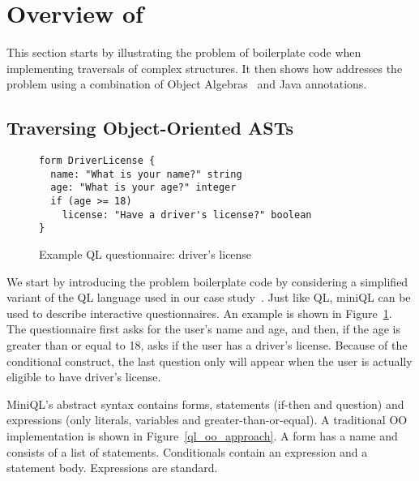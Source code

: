 \section{Overview of \name}\label{subsec:overview}

This section starts by illustrating the problem of boilerplate code when implementing
traversals of complex structures. It then shows how \name addresses
the problem using a combination of Object Algebras~\cite{bruno12oa}
and Java annotations.

\subsection{Traversing Object-Oriented ASTs  }


\begin{figure}[t]
\nocaptionrule
\begin{lstlisting}[language=ql]
form DriverLicense {
  name: "What is your name?" string
  age: "What is your age?" integer
  if (age >= 18) 
    license: "Have a driver's license?" boolean
}
\end{lstlisting}
\caption{Example QL questionnaire: driver's license}
\label{driver_license}
\end{figure}


We start by introducing the problem boilerplate code by considering a simplified variant of the QL language used in our case study~\cite{gouseti14extensible}.
Just like QL, miniQL can be used to describe interactive questionnaires. An example is shown in Figure~\ref{driver_license}.
The questionnaire first asks for the user's name and age, and then, if the age is greater than or equal to 18, asks if the user has a driver's license.
Because of the conditional construct, the last question only will appear when the user is actually eligible to have driver's license.

MiniQL's abstract syntax contains forms, statements (if-then and question) and expressions (only literals, variables and greater-than-or-equal).
A traditional OO implementation is shown in Figure~\ref{ql_oo_approach}. 
A form has a name and consists of a list of statements.
Conditionals contain an expression and a statement body. Expressions are standard. 


